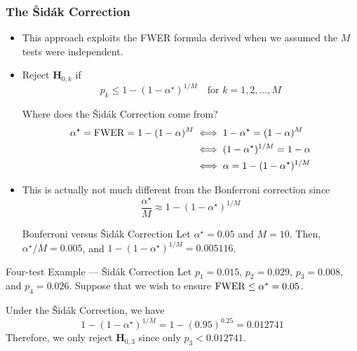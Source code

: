 \subsubsection*{The Šidák Correction}
\begin{itemize}
    \item This approach exploits the FWER formula derived when we assumed the $M$ tests were independent.
    \item Reject $ \mathbf{H}_{0,k} $ if
          \[ p_k\le 1-(1-\alpha^\star)^{1/M}\quad\text{for }k=1,2,\ldots,M \]
          \begin{Remark}{}{}
              Where does the Šidák Correction come from?
              \begin{align*}
                  \alpha^\star=\operatorname{FWER}=1-(1-\alpha)^M
                   & \iff 1-\alpha^\star = (1-\alpha)^M   \\
                   & \iff (1-\alpha^\star)^{1/M}=1-\alpha \\
                   & \iff \alpha=1-(1-\alpha^\star)^{1/M} \\
              \end{align*}
          \end{Remark}
    \item This is actually not much different from the Bonferroni correction since
          \[ \frac{\alpha^\star}{M} \approx 1-(1-\alpha^\star)^{1/M} \]
          \begin{Example}{Bonferroni versus Šidák Correction}{}
              Let $ \alpha^\star=0.05 $ and $ M=10 $. Then,
              $ \alpha^\star/M=0.005$, and $1-(1-\alpha^\star)^{1/M}=0.005116$.
          \end{Example}
\end{itemize}
\begin{Example}{Four-test Example --- Šidák Correction}{}
    Let $ p_1=0.015 $, $ p_2=0.029 $, $ p_3=0.008 $, and $ p_4=0.026 $. Suppose that we wish to ensure
    $ \operatorname{FWER}\le \alpha^\star=0.05 $.

    \vspace{2mm}

    Under the Šidák Correction, we have
    \[ 1-(1-\alpha^\star)^{1/M}=1-(0.95)^{0.25}=0.012741 \]
    Therefore, we only reject $ \mathbf{H}_{0,3} $ since only $ p_3<0.012741 $.
\end{Example}
